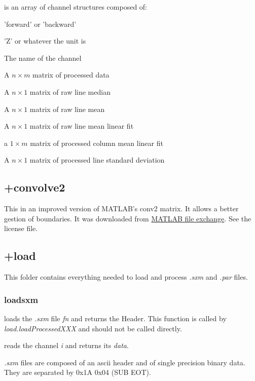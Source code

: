 \item[channels] is an array of channel structures composed of:
\bdf
\item[Direction] 'forward' or 'backward'
\item[Unit] 'Z' or whatever the unit is
\item[Name] The name of the channel
\item[data] A $n\times m$ matrix of processed data
\item[lineMedian] A $n\times 1$ matrix of raw line median
\item[lineMean] A $n\times 1$ matrix of raw line mean
\item[linePlane] A $n\times 1$ matrix of raw line mean linear fit
\item[lineResidualSlope] a $1\times m$ matrix of processed column mean linear fit
\item[lineStd] A $n\times 1$ matrix of processed line standard deviation
\edf

\edf
\subsection{+convolve2}
This in an improved version of MATLAB's conv2 matrix. It allows a better gestion of boundaries. 
It was downloaded from \href{http://www.mathworks.com/matlabcentral/fileexchange/22619-fast-2-d-convolution}{MATLAB file exchange}. See the license file.

\subsection{+load}
This folder contains everything needed to load and process \emph{.sxm} and \emph{.par} files.

\subsubsection{loadsxm}
\bdf

 loads the \emph{.sxm} file \emph{fn} and returns the Header. This function is called by \emph{load.loadProcessedXXX} and should not be called directly.

 reads the channel \emph{i} and returns its \emph{data}.

\edf

\emph{.sxm} files are composed of an ascii header and of single precision binary data. They are separated by 0x1A 0x04 (SUB EOT).

